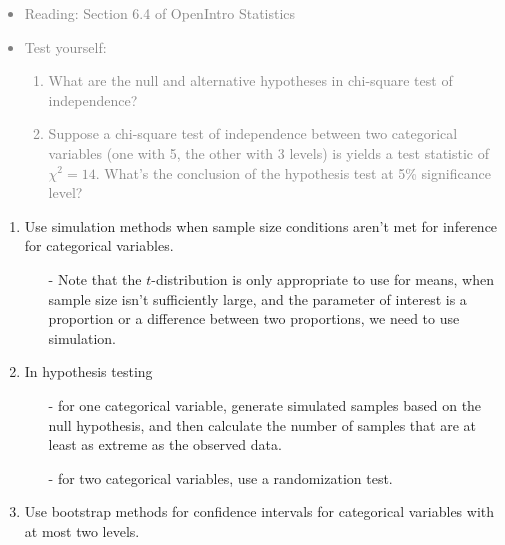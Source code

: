 \documentclass[11pt]{article}
\newcommand{\gray}[1]{\textcolor{gray}{#1}}
\begin{document}
\gray{
{\it
\vspace{-0.55cm}
\begin{itemize}
\renewcommand{\labelitemi}{{\textcolor{dark}{$\ast$}}}
\item Reading: Section 6.4 of OpenIntro Statistics
\item Test yourself:
\begin{enumerate}
\item What are the null and alternative hypotheses in chi-square test of independence?
\item Suppose a chi-square test of independence between two categorical variables (one with 5, the other with 3 levels) is yields a test statistic of $\chi^2 = 14$. What's the conclusion of the hypothesis test at 5\% significance level?
\end{enumerate}
\end{itemize}
}}

%

\begin{enumerate}[resume]
\renewcommand\labelenumi{\textcolor{light}{\textbf{LO \theenumi.}}}

\item Use simulation methods when sample size conditions aren't met for inference for categorical variables.
\begin{itemize}
\item[-] Note that the $t$-distribution is only appropriate to use for means, when sample size isn't sufficiently large, and the parameter of interest is a proportion or a difference between two proportions, we need to use simulation.
\end{itemize}

\item In hypothesis testing
\begin{itemize}
\item[-] for one categorical variable, generate simulated samples based on the null hypothesis, and then calculate the number of samples that are at least as extreme as the observed data.
\item[-] for two categorical variables, use a randomization test.
\end{itemize}

\item Use bootstrap methods for confidence intervals for categorical variables with at most two levels. 

\end{enumerate}
\end{document}
